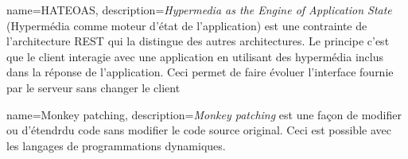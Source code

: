 \documentclass[a4paper,12pt,dvipsnames]{report}
\begin{document}
 { 
    name={HATEOAS}, 
    description={\textit{Hypermedia as the Engine of Application State} 
        (Hypermédia comme moteur d'état de l'application) est une contrainte 
        de l'architecture REST qui la distingue des autres architectures. 
        Le principe c'est que le client interagie avec une application en 
        utilisant des hypermédia inclus dans la réponse de l'application. 
        Ceci permet de faire évoluer l'interface fournie par le serveur sans 
        changer le client}
    }

 { 
    name={Monkey patching},
    description={\textit{Monkey patching} est une façon de modifier ou 
        d'étendrdu code sans modifier le code source original. Ceci est 
        possible avec les langages de programmations dynamiques.}
    }


\printglossaries


{} 
\printbibliography 
\end{document}
